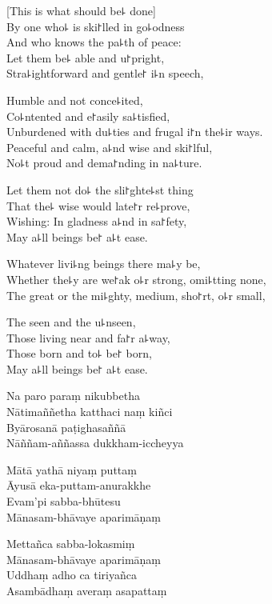 
\begin{leader}
\end{leader}

[This is what should be꜕ done]\\
By one who꜕ is ski꜓lled in go꜕odness\\
And who knows the pa꜕th of peace:\\
Let them be꜕ able and u꜓pright,\\
Stra꜕ightforward and gentle꜓ i꜕n speech,

Humble and not conce꜕ited,\\
Co꜕ntented and e꜓asily sa꜕tisfied,\\
Unburdened with du꜕ties and frugal i꜓n the꜕ir ways.\\
Peaceful and calm, a꜕nd wise and ski꜓lful,\\
No꜕t proud and dema꜓nding in na꜕ture.

Let them not do꜕ the sli꜓ghte꜕st thing\\
That the꜕ wise would late꜓r re꜕prove,\\
Wishing: In gladness a꜕nd in sa꜓fety,\\
May a꜕ll beings be꜓ a꜕t ease.

Whatever livi꜕ng beings there ma꜕y be,\\
Whether the꜕y are we꜓ak o꜕r strong, omi꜕tting none,\\
The great or the mi꜕ghty, medium, sho꜓rt, o꜕r small,

The seen and the u꜕nseen,\\
Those living near and fa꜓r a꜕way,\\
Those born and to꜕ be꜓ born,\\
May a꜕ll beings be꜓ a꜕t ease.

\clearpage

Na paro paraṃ nikubbetha\\%
Nātimaññetha katthaci naṃ kiñci\\
Byārosanā paṭighasaññā\\
Nāññam-aññassa dukkham-iccheyya

Mātā yathā niyaṃ puttaṃ\\
Āyusā eka-puttam-anurakkhe\\
Evam'pi sabba-bhūtesu\\
Mānasam-bhāvaye aparimāṇaṃ

Mettañca sabba-lokasmiṃ\\
Mānasam-bhāvaye aparimāṇaṃ\\
Uddhaṃ adho ca tiriyañca\\
Asambādhaṃ averaṃ asapattaṃ

